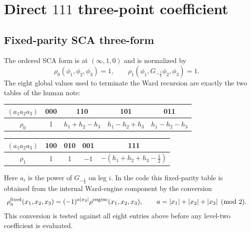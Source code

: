 \documentclass[11pt]{article}
\newcommand{\half}{\tfrac12}
\begin{document}
\section{Direct \(111\) three-point coefficient}

\subsection{Fixed-parity SCA three-form}

The ordered SCA form is at \((\infty,1,0)\) and is normalized by
\begin{equation}
 \rho_0(\phi_1,\phi_2,\phi_3)=1,
 \qquad
 \rho_1(\phi_1,G_{-\half}\phi_2,\phi_3)=1.
\end{equation}
The eight global values used to terminate the Ward recursion are exactly the
two tables of the human note:
\begin{center}
\begin{tabular}{c|cccc}
\toprule
\((a_1a_2a_3)\)&000&110&101&011\\
\midrule
\(\rho_0\)&1&\(h_1+h_2-h_3\)&\(h_1-h_2+h_3\)&\(h_1-h_2-h_3\)\\
\bottomrule
\end{tabular}

\vspace{0.5em}
\begin{tabular}{c|cccc}
\toprule
\((a_1a_2a_3)\)&100&010&001&111\\
\midrule
\(\rho_1\)&1&1&\(-1\)&\(-(h_1+h_2+h_3-\half)\)\\
\bottomrule
\end{tabular}
\end{center}
Here \(a_i\) is the power of \(G_{-\half}\) on leg \(i\).  In the code this
fixed-parity table is obtained from the internal Ward-engine component by the
conversion
\begin{equation}
 \rho_a^{\rm fixed}(x_1,x_2,x_3)
 =(-1)^{a|x_3|}\rho^{\rm engine}(x_1,x_2,x_3),
 \qquad a=|x_1|+|x_2|+|x_3|\pmod2.
 \label{eq:fixed-conversion}
\end{equation}
This conversion is tested against all eight entries above before any level-two
coefficient is evaluated.
\end{document}
